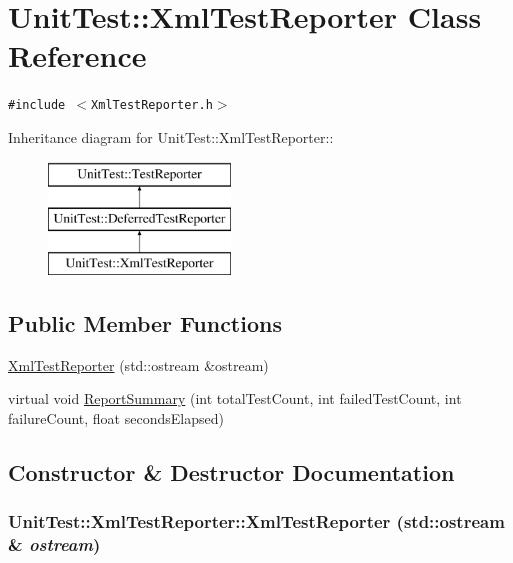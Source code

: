 \hypertarget{class_unit_test_1_1_xml_test_reporter}{
\section{UnitTest::XmlTestReporter Class Reference}
\label{class_unit_test_1_1_xml_test_reporter}
}
{\tt \#include $<$XmlTestReporter.h$>$}

Inheritance diagram for UnitTest::XmlTestReporter::\begin{figure}[H]
\begin{center}
\leavevmode
\includegraphics[height=3cm]{class_unit_test_1_1_xml_test_reporter}
\end{center}
\end{figure}
\subsection*{Public Member Functions}
\begin{CompactItemize}
\item 
\hyperlink{class_unit_test_1_1_xml_test_reporter_d868bfad11bf38544be0d048d644b922}{XmlTestReporter} (std::ostream \&ostream)
\item 
virtual void \hyperlink{class_unit_test_1_1_xml_test_reporter_9fa635aadd426628438e37de16431f5e}{ReportSummary} (int totalTestCount, int failedTestCount, int failureCount, float secondsElapsed)
\end{CompactItemize}


\subsection{Constructor \& Destructor Documentation}
\hypertarget{class_unit_test_1_1_xml_test_reporter_d868bfad11bf38544be0d048d644b922}{
\subsubsection[{XmlTestReporter}]{\setlength{\rightskip}{0pt plus 5cm}UnitTest::XmlTestReporter::XmlTestReporter (std::ostream \& {\em ostream})}}
\label{class_unit_test_1_1_xml_test_reporter_d868bfad11bf38544be0d048d644b922}




